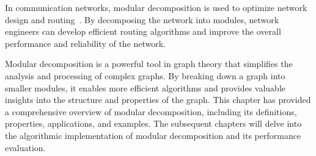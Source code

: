 In communication networks, modular decomposition is used to optimize network design and routing~\cite{MANTP}.
By decomposing the network into modules, network engineers can develop efficient routing algorithms and improve the overall performance and reliability of the network.


\hspace{4cm}

Modular decomposition is a powerful tool in graph theory that simplifies the analysis and processing of complex graphs.
By breaking down a graph into smaller modules, it enables more efficient algorithms and provides valuable insights into the structure and properties of the graph.
This chapter has provided a comprehensive overview of modular decomposition, including its definitions, properties, applications, and examples.
The subsequent chapters will delve into the algorithmic implementation of modular decomposition and its performance evaluation.


